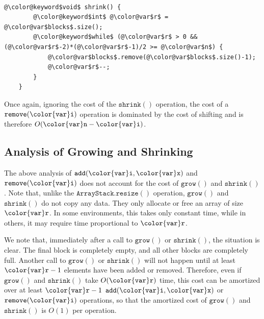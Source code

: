 \documentclass[10pt]{book}
\theoremstyle{plain}
\theoremstyle{definition}
\begin{document}
 \ \vspace{.5ex}\begin{Verbatim}[gobble=1,tabsize=2,frame=single,framerule=1.2pt,commandchars=\\@\$,label=\texttt{RootishArrayStack},labelposition=topline]
	@\color@keyword$void$ shrink() {
		@\color@keyword$int$ @\color@var$r$ = @\color@var$blocks$.size();
		@\color@keyword$while$ (@\color@var$r$ > 0 && (@\color@var$r$-2)*(@\color@var$r$-1)/2 >= @\color@var$n$) {
			@\color@var$blocks$.remove(@\color@var$blocks$.size()-1);
			@\color@var$r$--;
		}
	}
\end{Verbatim}


Once again, ignoring the cost of the \ensuremath{\mathtt{shrink()}} operation, the cost of
a \ensuremath{\mathtt{remove({\color{var}i})}} operation is dominated by the cost of shifting  and is
therefore $O(\ensuremath{\mathtt{{\color{var}n}}}-\ensuremath{\mathtt{{\color{var}i}}})$.

\subsection{Analysis of Growing and Shrinking}

The above analysis of \ensuremath{\mathtt{add({\color{var}i},{\color{var}x})}} and \ensuremath{\mathtt{remove({\color{var}i})}} does not account for
the cost of \ensuremath{\mathtt{grow()}} and \ensuremath{\mathtt{shrink()}}.  Note that, unlike the
\ensuremath{\mathtt{ArrayStack.resize()}} operation, \ensuremath{\mathtt{grow()}} and \ensuremath{\mathtt{shrink()}} do not copy
any data.  They only allocate or free an array of size \ensuremath{\mathtt{{\color{var}r}}}.  In
some environments, this takes only constant time, while in others, it
may require time proportional to \ensuremath{\mathtt{{\color{var}r}}}.

We note that, immediately after a call to \ensuremath{\mathtt{grow()}} or \ensuremath{\mathtt{shrink()}}, the
situation is clear. The final block is completely empty, and all other
blocks are completely full.  Another call to \ensuremath{\mathtt{grow()}} or \ensuremath{\mathtt{shrink()}} will
not happen until at least $\ensuremath{\mathtt{{\color{var}r}}}-1$ elements have been added or removed.
Therefore, even if \ensuremath{\mathtt{grow()}} and \ensuremath{\mathtt{shrink()}} take $O(\ensuremath{\mathtt{{\color{var}r}}})$ time, this
cost can be amortized over at least $\ensuremath{\mathtt{{\color{var}r}}}-1$ \ensuremath{\mathtt{add({\color{var}i},{\color{var}x})}} or \ensuremath{\mathtt{remove({\color{var}i})}}
operations, so that the amortized cost of \ensuremath{\mathtt{grow()}} and \ensuremath{\mathtt{shrink()}} is
$O(1)$ per operation.
\end{document}
